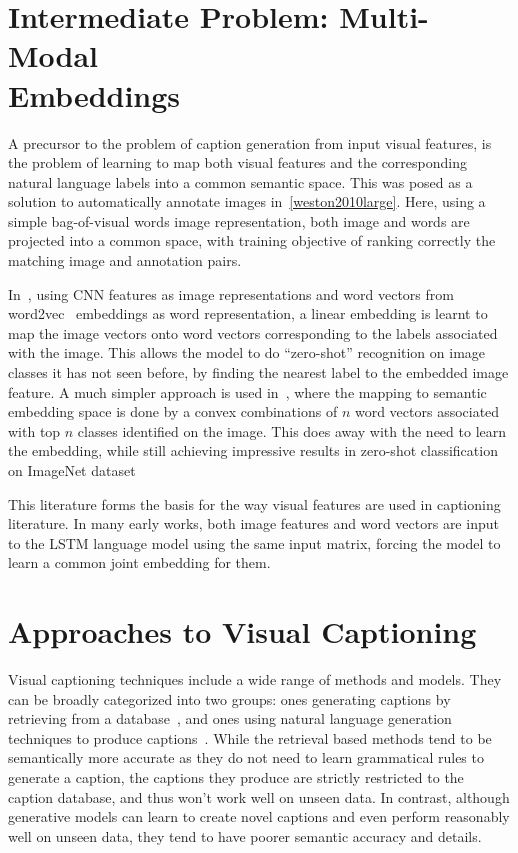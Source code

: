 \section{Intermediate Problem: Multi-Modal \\Embeddings}
A precursor to the problem of caption generation from input visual features, is
the problem of learning to map both visual features and the
corresponding natural language labels into a common semantic space.
This was posed as a solution to automatically annotate images
in~\ref{weston2010large}.
Here, using a simple bag-of-visual words image representation, both image and
words are projected into a common space, with training objective of ranking
correctly the matching image and annotation pairs. 

In~\cite{frome2013devise}, using CNN features as image representations and
word vectors from word2vec~\cite{mikolov2013distributed} embeddings as word
representation, a linear embedding is learnt to map the image vectors onto
word vectors corresponding to the labels associated with the image.
This allows the model to do ``zero-shot'' recognition on image classes it has
not seen before, by finding the nearest label to the embedded image feature.
A much simpler approach is used in~\cite{norouzi2013zero}, where the mapping to
semantic embedding space is done by a convex combinations of $n$ word vectors
associated with top $n$ classes identified on the image.
This does away with the need to learn the embedding, while still achieving
impressive results in zero-shot classification on ImageNet dataset

This literature forms the basis for the way visual features are used in
captioning literature.
In many early works, both image features and word vectors are input to the LSTM
language model using the same input matrix, forcing the model to learn a common
joint embedding for them.

\section{Approaches to Visual Captioning}
Visual captioning techniques include a wide range of methods and models.
They can be broadly categorized into two groups: ones generating captions by
retrieving from a database~\cite{Farhadi2010, Hodosh2013,Karpathy2014},
and ones using natural language generation techniques to produce
captions~\cite{Li2011,kulkarni2013babytalk,Vinyals_2015_CVPR,Fang2015}.
While the retrieval based methods tend to be semantically more accurate as they
do not need to learn grammatical rules to generate a caption, the captions they
produce are strictly restricted to the caption database, and thus won't work
well on unseen data.
In contrast, although generative models can learn to create novel captions and even
perform reasonably well on unseen data, they tend to have poorer semantic
accuracy and details.

